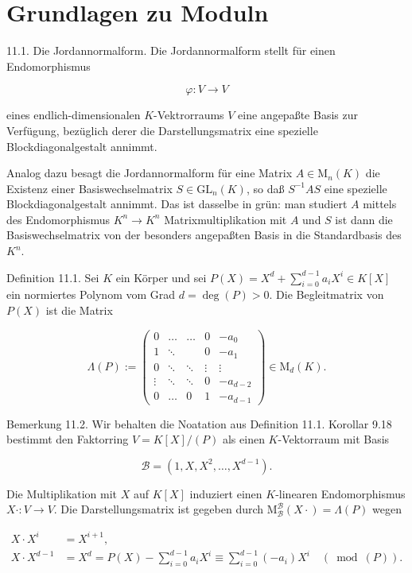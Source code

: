 \documentclass[10pt, letterpaper]{article}
\begin{document}
\section*{Grundlagen zu Moduln}
11.1. Die Jordannormalform. Die Jordannormalform stellt für einen Endomorphismus

$$
\varphi: V \rightarrow V
$$

eines endlich-dimensionalen $K$-Vektrorraums $V$ eine angepaßte Basis zur Verfügung, bezüglich derer die Darstellungsmatrix eine spezielle Blockdiagonalgestalt annimmt.

Analog dazu besagt die Jordannormalform für eine Matrix $A \in \mathrm{M}_{n}(K)$ die Existenz einer Basiswechselmatrix $S \in \mathrm{GL}_{n}(K)$, so daß $S^{-1} A S$ eine spezielle Blockdiagonalgestalt annimmt. Das ist dasselbe in grün: man studiert $A$ mittels des Endomorphismus $K^{n} \rightarrow K^{n}$ Matrixmultiplikation mit $A$ und $S$ ist dann die Basiswechselmatrix von der besonders angepaßten Basis in die Standardbasis des $K^{n}$.

Definition 11.1. Sei $K$ ein Körper und sei $P(X)=X^{d}+\sum_{i=0}^{d-1} a_{i} X^{i} \in K[X]$ ein normiertes Polynom vom Grad $d=\operatorname{deg}(P)>0$. Die Begleitmatrix von $P(X)$ ist die Matrix

$$
\Lambda(P):=\left(\begin{array}{ccccc}
0 & \ldots & \ldots & 0 & -a_{0} \\
1 & \ddots & & 0 & -a_{1} \\
0 & \ddots & \ddots & \vdots & \vdots \\
\vdots & \ddots & \ddots & 0 & -a_{d-2} \\
0 & \ldots & 0 & 1 & -a_{d-1}
\end{array}\right) \in \mathrm{M}_{d}(K) .
$$

Bemerkung 11.2. Wir behalten die Noatation aus Definition 11.1. Korollar 9.18 bestimmt den Faktorring $V=K[X] /(P)$ als einen $K$-Vektorraum mit Basis

$$
\mathscr{B}=\left(1, X, X^{2}, \ldots, X^{d-1}\right) .
$$

Die Multiplikation mit $X$ auf $K[X]$ induziert einen $K$-linearen Endomorphismus $X \cdot: V \rightarrow V$. Die Darstellungsmatrix ist gegeben durch $\mathrm{M}_{\mathscr{B}}^{\mathscr{B}}(X \cdot)=\Lambda(P)$ wegen

$$
\begin{aligned}
X \cdot X^{i} & =X^{i+1}, \\
X \cdot X^{d-1} & =X^{d}=P(X)-\sum_{i=0}^{d-1} a_{i} X^{i} \equiv \sum_{i=0}^{d-1}\left(-a_{i}\right) X^{i} \quad(\bmod (P)) .
\end{aligned}
$$
\end{document}
